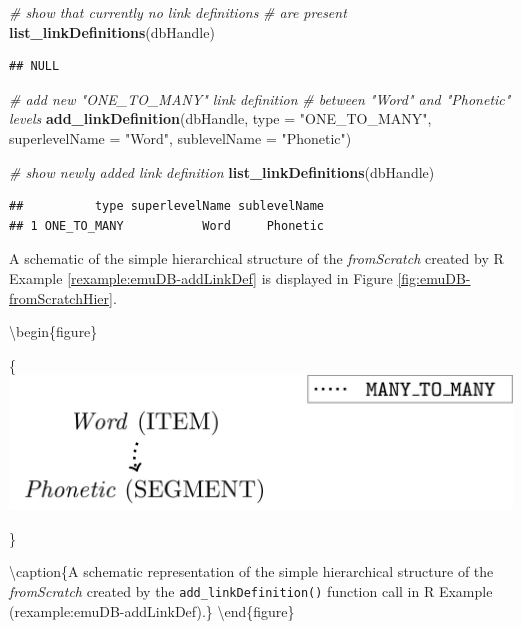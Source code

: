 \documentclass[]{book}
\newenvironment{Shaded}{\begin{snugshade}}{\end{snugshade}}
\newcommand{\CommentTok}[1]{\textcolor[rgb]{0.56,0.35,0.01}{\textit{#1}}}
\newcommand{\DataTypeTok}[1]{\textcolor[rgb]{0.13,0.29,0.53}{#1}}
\newcommand{\KeywordTok}[1]{\textcolor[rgb]{0.13,0.29,0.53}{\textbf{#1}}}
\newcommand{\NormalTok}[1]{#1}
\newcommand{\StringTok}[1]{\textcolor[rgb]{0.31,0.60,0.02}{#1}}
\theoremstyle{definition}
\theoremstyle{definition}
\theoremstyle{definition}
\theoremstyle{remark}
\begin{document}
\begin{Shaded}
\begin{Highlighting}[]
\CommentTok{# show that currently no link definitions}
\CommentTok{# are present}
\KeywordTok{list_linkDefinitions}\NormalTok{(dbHandle)}
\end{Highlighting}
\end{Shaded}

\begin{verbatim}
## NULL
\end{verbatim}

\begin{Shaded}
\begin{Highlighting}[]
\CommentTok{# add new "ONE_TO_MANY" link definition}
\CommentTok{# between "Word" and "Phonetic" levels}
\KeywordTok{add_linkDefinition}\NormalTok{(dbHandle,}
                   \DataTypeTok{type =} \StringTok{"ONE_TO_MANY"}\NormalTok{,}
                   \DataTypeTok{superlevelName =} \StringTok{"Word"}\NormalTok{,}
                   \DataTypeTok{sublevelName =} \StringTok{"Phonetic"}\NormalTok{)}

\CommentTok{# show newly added link definition}
\KeywordTok{list_linkDefinitions}\NormalTok{(dbHandle)}
\end{Highlighting}
\end{Shaded}

\begin{verbatim}
##          type superlevelName sublevelName
## 1 ONE_TO_MANY           Word     Phonetic
\end{verbatim}

A schematic of the simple hierarchical structure of the
\emph{fromScratch} created by R Example \ref{rexample:emuDB-addLinkDef}
is displayed in Figure \ref{fig:emuDB-fromScratchHier}.

\textbackslash{}begin\{figure\}

\{\centering \includegraphics[width=0.5\linewidth]{pics/fromScratchDBgraph}

\}

\textbackslash{}caption\{A schematic representation of the simple
hierarchical structure of the \emph{fromScratch} created by the
\texttt{add\_linkDefinition()} function call in R Example
\citet{ref}(rexample:emuDB-addLinkDef).\}\label{fig:emuDB-fromScratchHier}
\textbackslash{}end\{figure\}
\end{document}
